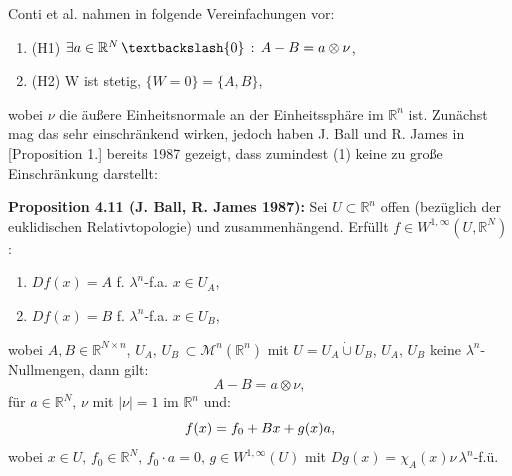 Conti et al. nahmen in \cite{ContiTwoGradientPhase} folgende Vereinfachungen vor:
\begin{enumerate}
    \item (H1) \(\exists a \in \mathbb{R}^N \, \textbackslash \{0\} \, : \, A - B = a \otimes \nu\),
    \item (H2) W ist stetig, \(\{W = 0\} = \{A,B\}\),
\end{enumerate}
wobei \(\nu\) die äußere Einheitsnormale an der Einheitssphäre im \(\mathbb{R}^n\) ist. Zunächst mag das sehr einschränkend wirken, jedoch haben J. Ball und R. James in \cite{ball1987fine}[Proposition 1.] bereits 1987 gezeigt, dass zumindest (1) keine zu große Einschränkung darstellt:\\[0.5cm]
\colorbox{generalYellow}{\begin{minipage}{16cm}{\textcolor{black}{}{\label{prop4.11}}}
\textbf{Proposition 4.11 (J. Ball, R. James 1987):} Sei \(U \subset \mathbb{R}^n\) offen (bezüglich der euklidischen Relativtopologie) und zusammenhängend. Erfüllt \(f \in W^{1,\infty}(U,\mathbb{R}^N)\):
\begin{enumerate}
    \item \(Df(x) = A\) f. \(\lambda^n\)-f.a. \(x \in U_A\),
    \item \(Df(x) = B\) f. \(\lambda^n\)-f.a. \(x \in U_B\),
\end{enumerate}
wobei \(A,B \in \mathbb{R}^{N \times n}\), \(U_A, \, U_B \, \subset \mathcal{M}^n(\mathbb{R}^n)\) mit \(U = U_A \dot{\cup} U_B\), \(U_A, \, U_B\) keine \(\lambda^n\)-Nullmengen, dann gilt:
\begin{equation}
    A - B = a \otimes \nu,
\end{equation}
für \(a \in \mathbb{R}^N, \, \nu\) mit \(|\nu| = 1\) im \(\mathbb{R}^n\) und:
\begin{equation}{\label{eq4.53}}
    f(x) = f_0 + Bx + g(x)a,
\end{equation}
wobei \(x \in U, \, f_0 \in \mathbb{R}^N, \, f_0 \cdot a = 0, \, g \in W^{1,\infty}(U)\) mit \(Dg(x) = \chi_A(x)\nu \, \lambda^n\)-f.ü.
\end{minipage}}

